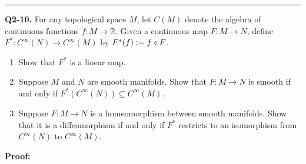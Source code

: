 \documentclass{article}
\newcommand{\R}{\mathbb{R}}
\newcommand{\defeq}{\vcentcolon=}
\begin{document}
\vskip 0.5cm
\hrule 
\vskip 0.5cm


\textbf{Q2-10.} For any topological space $M$, let $C(M)$ denote the algebra of continuous functions $f : M \rightarrow \R$. Given a continuous map $F : M \rightarrow N$, define $F^{*} : C^{\infty}(N) \rightarrow C^{\infty}(M)$ by $F^*(f) \defeq f \circ F$.

\begin{enumerate}[label=(\alph*)]
  \item Show that $F^*$ is a linear map.
  \item Suppose $M$ and $N$ are smooth manifolds. Show that $F : M \rightarrow N$ is smooth if and only if $F^*(C^{\infty}(N)) \subseteq C^{\infty}(M)$.
  \item Suppose $F : M \rightarrow N$ is a homeomorphism between smooth manifolds. Show that it is a diffeomorphism if and only if $F^*$ restricts to an isomorphism from $C^{\infty}(N)$ to $C^{\infty}(M)$.
\end{enumerate}

\vskip 0.5cm
\textbf{Proof:}
\end{document}

